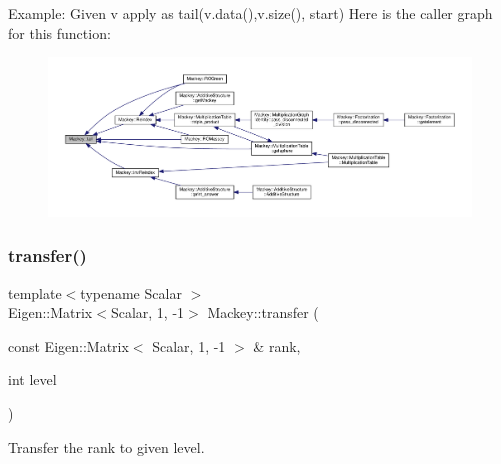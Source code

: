 Example\+: Given v apply as tail(v.\+data(),v.\+size(), start) Here is the caller graph for this function\+:\nopagebreak
\begin{figure}[H]
\begin{center}
\leavevmode
\includegraphics[width=350pt]{namespaceMackey_a1e4b11e9d2a5b70f8380af87cae31ef3_icgraph}
\end{center}
\end{figure}
\mbox{\label{namespaceMackey_a671613d53fc3b0c9c4b115bc8b2797e6}} 
\subsubsection{\texorpdfstring{transfer()}{transfer()}\hspace{0.1cm}{\footnotesize\ttfamily [1/6]}}
{\footnotesize\ttfamily template$<$typename Scalar $>$ \\
Eigen\+::\+Matrix$<$Scalar, 1, -\/1$>$ Mackey\+::transfer (\begin{DoxyParamCaption}\item[{const Eigen\+::\+Matrix$<$ Scalar, 1, -\/1 $>$ \&}]{rank,  }\item[{int}]{level }\end{DoxyParamCaption})}



Transfer the rank to given level. 

